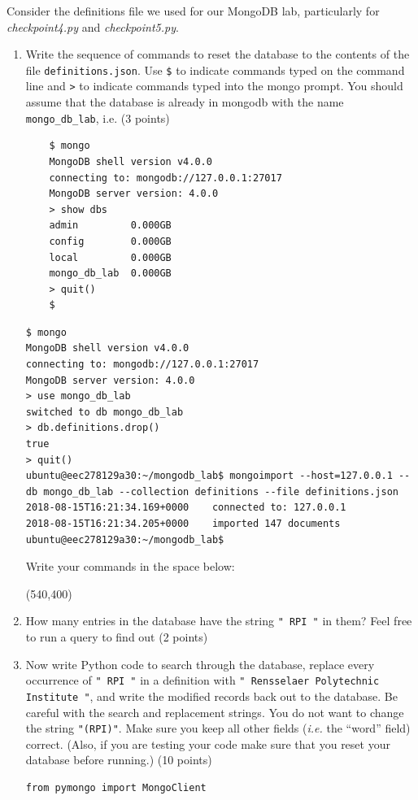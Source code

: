 \documentclass[10pt]{article}
\begin{document}
\begin{enumerate}
	Consider the definitions file we used for our MongoDB lab, particularly for \textit{checkpoint4.py} and \textit{checkpoint5.py}. 
	\begin{enumerate}
	\item Write the sequence of commands to reset the database to the contents of the file \verb|definitions.json|. Use \verb|$| to indicate commands typed on the command line and \verb|>| to indicate commands typed into the mongo prompt. You should assume that the database is already in mongodb with the name \verb|mongo_db_lab|, i.e. (3 points)
	\begin{verbatim}
	$ mongo
	MongoDB shell version v4.0.0
	connecting to: mongodb://127.0.0.1:27017
	MongoDB server version: 4.0.0
	> show dbs
	admin         0.000GB
	config        0.000GB
	local         0.000GB
	mongo_db_lab  0.000GB
	> quit()
	$
	\end{verbatim}
	
\beginanswers
\begin{verbatim}
$ mongo
MongoDB shell version v4.0.0
connecting to: mongodb://127.0.0.1:27017
MongoDB server version: 4.0.0
> use mongo_db_lab
switched to db mongo_db_lab
> db.definitions.drop()
true
> quit()
ubuntu@eec278129a30:~/mongodb_lab$ mongoimport --host=127.0.0.1 --db mongo_db_lab --collection definitions --file definitions.json
2018-08-15T16:21:34.169+0000	connected to: 127.0.0.1
2018-08-15T16:21:34.205+0000	imported 147 documents
ubuntu@eec278129a30:~/mongodb_lab$ 
\end{verbatim}

\else

Write your commands in the space below:

\hspace*{-0.4in}\framebox(540,400){}
\fi

\newpage
\item How many entries in the database have the string \verb|" RPI "| in them? Feel free to run a query to find out (2 points)
\beginanswers
{}
\bigskip
\else
\bigskip
\bigskip
\bigskip
\fi

\item Now write Python code to search through the database, replace every occurrence of \verb|" RPI "| in a definition with \verb|" Rensselaer Polytechnic Institute "|, and write the modified records back out to the database. Be careful with the search and replacement strings. You do not want to change the string \verb|"(RPI)"|. Make sure you keep all other fields (\textit{i.e.} the ``word'' field) correct. (Also, if you are testing your code make sure that you reset your database before running.) (10 points)
\beginanswers
\begin{verbatim}
from pymongo import MongoClient


\end{verbatim}
\end{enumerate}
\end{enumerate}
\end{document}
